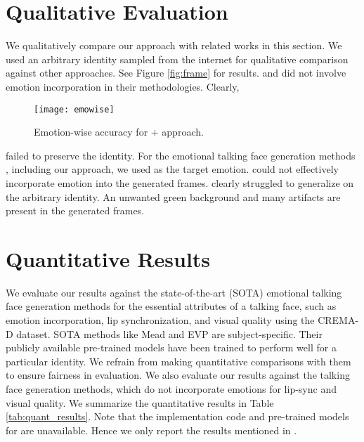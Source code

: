 \documentclass[accepted]{uai2023}
\begin{document}
\section{Qualitative Evaluation}
\label{section:qr}
We qualitatively compare our {} approach with related works in this section.
We used an arbitrary identity sampled from the internet for qualitative comparison against other approaches. See Figure \ref{fig:frame} for results.
\cite{wang2021audio2head} and \cite{prajwal2020lip} did not involve emotion incorporation in their methodologies. Clearly, 
\begin{figure}[htp]
    \centering
    \texttt{[image: emowise]}
    \caption{Emotion-wise accuracy for + approach.}
    \label{fig:emowise}
\end{figure} 
\citet{wang2021audio2head} failed to preserve the identity. For the emotional talking face generation methods \citep{9496264,magnusson2021invertable}, including our approach, we used {} as the target emotion. \citet{9496264} could not effectively incorporate emotion into the generated frames. 
\citet{magnusson2021invertable} 
clearly struggled to generalize on the arbitrary identity. An unwanted green background and many artifacts are present in the generated frames.













\section{Quantitative Results}
We evaluate our results against the state-of-the-art (SOTA) emotional talking face generation methods \citep{DBLP:journals/corr/abs-1906-06337,9496264, sinha2022emotion} for the essential attributes of a talking face, such as emotion incorporation, lip synchronization, and visual quality using the CREMA-D \citep{cao2014crema} dataset.
SOTA methods like Mead \citep{wang2020mead} and EVP \citep{Ji_2021_CVPR} are subject-specific. Their publicly available pre-trained models have been trained to perform well for a particular identity. We refrain from making quantitative comparisons with them to ensure fairness in evaluation. We also evaluate our results against the talking face generation methods, which do not incorporate emotions \citep{prajwal2020lip, wang2021audio2head} for lip-sync and visual quality. We summarize the quantitative results in Table \ref{tab:quant_results}. Note that the implementation code and pre-trained models for \citep{DBLP:journals/corr/abs-1906-06337, sinha2022emotion} are unavailable. Hence we only report the results mentioned in \citep{sinha2022emotion}. 
\end{document}
